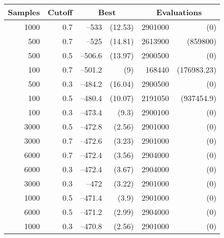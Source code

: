 \begin{table}
\centering
\caption{}
\begin{tabular}{|r|r|rr|rr|}
\hline
\multicolumn{1}{|c|}{Samples} & \multicolumn{1}{c|}{Cutoff} &
 \multicolumn{2}{c|}{Best} & 
 \multicolumn{2}{c|}{Evaluations}  \\ \hline
1000 & 0.7 & --533 & (12.53) & 2901000 & (0) \\ \hline
500 & 0.7 & --525 & (14.81) & 2613900 & (859800) \\ \hline
500 & 0.5 & --506.6 & (13.97) & 2900500 & (0) \\ \hline
100 & 0.7 & --501.2 & (9) & 168440 & (176983.23) \\ \hline
500 & 0.3 & --484.2 & (16.04) & 2900500 & (0) \\ \hline
100 & 0.5 & --480.4 & (10.07) & 2191050 & (937454.9) \\ \hline
100 & 0.3 & --473.4 & (9.3) & 2900100 & (0) \\ \hline
3000 & 0.5 & --472.8 & (2.56) & 2901000 & (0) \\ \hline
3000 & 0.7 & --472.6 & (3.23) & 2901000 & (0) \\ \hline
6000 & 0.7 & --472.4 & (3.56) & 2904000 & (0) \\ \hline
6000 & 0.3 & --472.4 & (3.67) & 2904000 & (0) \\ \hline
3000 & 0.3 & --472 & (3.22) & 2901000 & (0) \\ \hline
1000 & 0.5 & --471.4 & (3.9) & 2901000 & (0) \\ \hline
6000 & 0.5 & --471.2 & (2.99) & 2904000 & (0) \\ \hline
1000 & 0.3 & --470.8 & (2.56) & 2901000 & (0) \\ \hline
\end{tabular}
\label{ce-2d-ising}
\end{table}